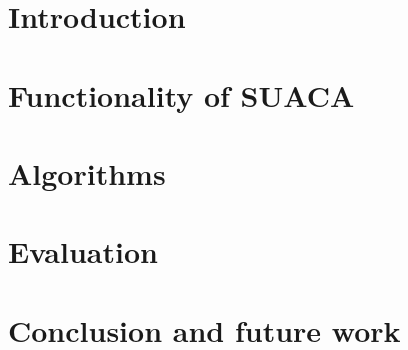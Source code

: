 \documentclass[a4paper,12pt,titlepage, twoside, openright]{report}
\begin{document}
\setlength{\oddsidemargin}{\dimexpr (\paperwidth-\textwidth)/2 - 1in\relax}
\setlength{\evensidemargin}{\oddsidemargin}



\setcounter{page}{0}
\tableofcontents 



\chapter{Introduction}






\chapter{Functionality of SUACA}
\label{chap:functionality}






\chapter{Algorithms}
\label{chap:algorithms}





\chapter{Evaluation}
\label{chap:eval}





\chapter{Conclusion and future work}




\printbibliography
\end{document}
